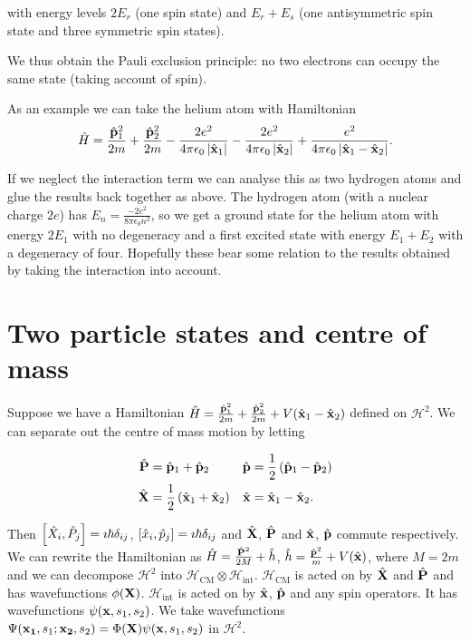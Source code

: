 \documentclass{notes}
\newcommand{\cH}{\mathcal{H}}
\newcommand{\com}[2]{\left[#1,#2\right]}
\begin{document}
with energy levels $2 E_r$ (one spin state) and $E_r + E_s$
(one antisymmetric spin state and three symmetric spin states).

We thus obtain the Pauli exclusion principle: no two electrons can occupy
the same state (taking account of spin).

As an example we can take the helium atom with Hamiltonian
\[
\Hat{H} = \frac{\Hat{\mathbf{p}}_1^2}{2 m}
+ \frac{\Hat{\mathbf{p}}_2^2}{2 m}
- \frac{2 e^2}{4 \pi \epsilon_0 \left|\Hat{\mathbf{x}}_1\right|}
- \frac{2 e^2}{4 \pi \epsilon_0 \left|\Hat{\mathbf{x}}_2\right|}
+ \frac{e^2}{4 \pi \epsilon_0 \left|\Hat{\mathbf{x}}_1 - \Hat{\mathbf{x}}_2\right|}.
\]

If we neglect the interaction term we can analyse this as two hydrogen atoms
and glue the results back together as above.  The hydrogen atom (with a
nuclear charge $2e$) has
$E_n = \frac{-2 e^2}{8 \pi \epsilon_0 n^2}$, so we get a ground state for the
helium atom with energy $2 E_1$ with no degeneracy and a first excited
state with energy $E_1 + E_2$ with a degeneracy of four.  Hopefully these
bear some relation to the results obtained by taking the interaction into
account.

\section{Two particle states and centre of mass}

Suppose we have a Hamiltonian $\Hat{H} = \frac{\Hat{\mathbf{p}}_1^2}{2 m}
+\frac{\Hat{\mathbf{p}}_2^2}{2 m} + V(\Hat{\mathbf{x}}_1-\Hat{\mathbf{x}}_2)$
defined on $\cH^2$.  We can separate out the centre of mass motion
by letting

\begin{align*}
\Hat{\mathbf{P}} &= \Hat{\mathbf{p}}_1 + \Hat{\mathbf{p}}_2 &
\Hat{\mathbf{p}} &= \frac{1}{2} \left(\Hat{\mathbf{p}}_1 - \Hat{\mathbf{p}}_2
\right) \\
\Hat{\mathbf{X}} &= \frac{1}{2} \left(\Hat{\mathbf{x}}_1 + \Hat{\mathbf{x}}_2
\right) &
\Hat{\mathbf{x}} &= \Hat{\mathbf{x}}_1 - \Hat{\mathbf{x}}_2.
\end{align*}

Then $\com{\Hat{X}_i}{\Hat{P}_j} = \imath \hbar \delta_{ij}$,
$\com{\Hat{x}_i}{\Hat{p}_j} = \imath \hbar \delta_{ij}$ and
$\Hat{\mathbf{X}}$, $\Hat{\mathbf{P}}$ and $\Hat{\mathbf{x}}$, $\Hat{\mathbf{p}}$
commute respectively.  We can rewrite the Hamiltonian as
$\Hat{H} = \frac{\Hat{\mathbf{P}}^2}{2 M} + \Hat{h}$,
$\Hat{h} = \frac{\Hat{\mathbf{p}}^2}{m} + V(\Hat{\mathbf{x}})$, where
$M = 2 m$ and we can decompose $\cH^2$ into
$\cH_{\text{CM}} \otimes \cH_{\text{int}}$.  $\cH_{\text{CM}}$ is acted
on by $\Hat{\mathbf{X}}$ and $\Hat{\mathbf{P}}$ and has wavefunctions
$\phi(\mathbf{X})$.  $\cH_{\text{int}}$ is acted on by $\Hat{\mathbf{x}}$,
$\Hat{\mathbf{p}}$ and any spin operators.  It has wavefunctions
$\psi(\mathbf{x},s_1,s_2)$.  We take wavefunctions
$\Psi(\mathbf{x_1}, s_1; \mathbf{x_2},s_2) = \Phi(\mathbf{X})
\psi(\mathbf{x},s_1,s_2)$ in $\cH^2$.
\end{document}
